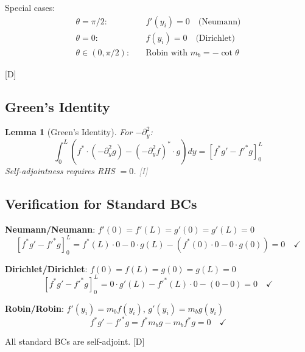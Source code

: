 \documentclass[11pt,a4paper]{article}
\newtheorem{lemma}[theorem]{Lemma}
\newcommand{\tagD}{\textcolor{blue!70!black}{[D]}}
\newcommand{\tagI}{\textcolor{gray}{[I]}}
\begin{document}
Special cases:
\begin{align}
\label{eq:sep-N}
\theta = \pi/2: \quad & f'(y_i) = 0 \quad \text{(Neumann)} \\
\label{eq:sep-D}
\theta = 0: \quad & f(y_i) = 0 \quad \text{(Dirichlet)} \\
\label{eq:sep-R}
\theta \in (0, \pi/2): \quad & \text{Robin with } m_b = -\cot\theta
\end{align}

\tagD

\subsection{Green's Identity}

\begin{lemma}[Green's Identity]
\label{lem:green}
For $-\partial_y^2$:
\begin{equation}
\label{eq:green}
\int_0^L (f^* \cdot (-\partial_y^2 g) - (-\partial_y^2 f)^* \cdot g) dy = [f^* g' - f'^* g]_0^L
\end{equation}
Self-adjointness requires RHS $= 0$. \tagI
\end{lemma}

\subsection{Verification for Standard BCs}

\textbf{Neumann/Neumann}: $f'(0) = f'(L) = g'(0) = g'(L) = 0$
\begin{equation}
\label{eq:verify-NN}
[f^* g' - f'^* g]_0^L = f^*(L) \cdot 0 - 0 \cdot g(L) - (f^*(0) \cdot 0 - 0 \cdot g(0)) = 0 \quad \checkmark
\end{equation}

\textbf{Dirichlet/Dirichlet}: $f(0) = f(L) = g(0) = g(L) = 0$
\begin{equation}
\label{eq:verify-DD}
[f^* g' - f'^* g]_0^L = 0 \cdot g'(L) - f'^*(L) \cdot 0 - (0 - 0) = 0 \quad \checkmark
\end{equation}

\textbf{Robin/Robin}: $f'(y_i) = m_b f(y_i)$, $g'(y_i) = m_b g(y_i)$
\begin{equation}
\label{eq:verify-RR}
f^* g' - f'^* g = f^* m_b g - m_b f^* g = 0 \quad \checkmark
\end{equation}

All standard BCs are self-adjoint. \tagD

\end{document}
